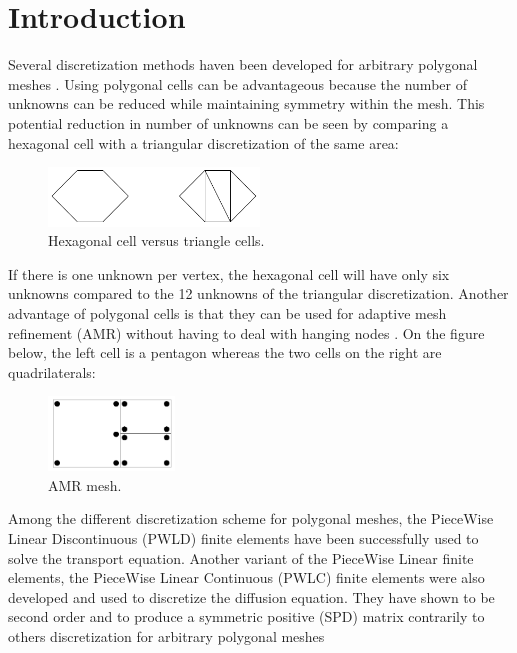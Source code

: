 \section{Introduction}
Several discretization methods haven been developed for arbitrary polygonal
meshes \cite{pwld_2d,pwld_3d,pwl_diffusion,palmer_ane,palmer_proc,palmer_fe,
wachspress,cell_centered_diff,mimetic}.  Using polygonal
cells can be advantageous because the number of unknowns can be reduced while
maintaining symmetry within the mesh. This potential reduction in 
number of unknowns can be seen by comparing a hexagonal cell with a triangular
discretization of the same area:
\begin{figure}[H]
\centering
\includegraphics[width=0.5\textwidth]{hex_tri_cells}
\caption{Hexagonal cell versus triangle cells.}
\end{figure}
If there is one unknown per vertex, the hexagonal cell will have only six
unknowns compared to the 12 unknowns of the triangular discretization. Another 
advantage of polygonal cells is that they can be used for adaptive mesh refinement 
(AMR) \cite{amr_rad,amr_block,amr_unstruc} without having to
deal with hanging nodes \cite{arbitrary_hanging_nodes,dealII_hanging_nodes,
locally_hanging_nodes}. On the figure below, the left cell is a pentagon whereas 
the two cells on the right are quadrilaterals:
\begin{figure}[H]
\centering
\includegraphics[width=0.3\textwidth]{amr}
\caption{AMR mesh.}
\end{figure}
Among the different discretization scheme for polygonal meshes, the PieceWise 
Linear Discontinuous (PWLD) finite elements \cite{pwld_2d,pwld_3d} have been 
successfully used to solve the transport equation. Another variant of the
PieceWise Linear finite elements, the PieceWise Linear Continuous (PWLC) finite 
elements were also developed and used to discretize the diffusion equation. 
They have shown to be second order and to produce a symmetric positive (SPD) 
matrix contrarily to others discretization for arbitrary polygonal meshes 
